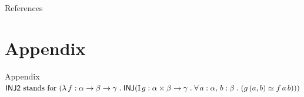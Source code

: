 \documentclass[xcolor={dvipsnames}]{beamer}
\begin{document}

\begin{frame}{References}
    
    
\end{frame}

\section{Appendix}
\begin{frame}{Appendix}
$\mathsf{INJ2} \text{ stands for }
(\lambda\, f : {\alpha} \rightarrow {{\beta} \rightarrow {\gamma}} \mathrel{.} \mathsf{INJ}(\mathrm{I}\, g : {\alpha \times \beta} \rightarrow {\gamma} \mathrel{.} \forall\, a : \alpha,\, b : \beta \mathrel{.} ({g\,(a,b)} \simeq {f\,a\,b})))
$
\end{frame}
\end{document}
